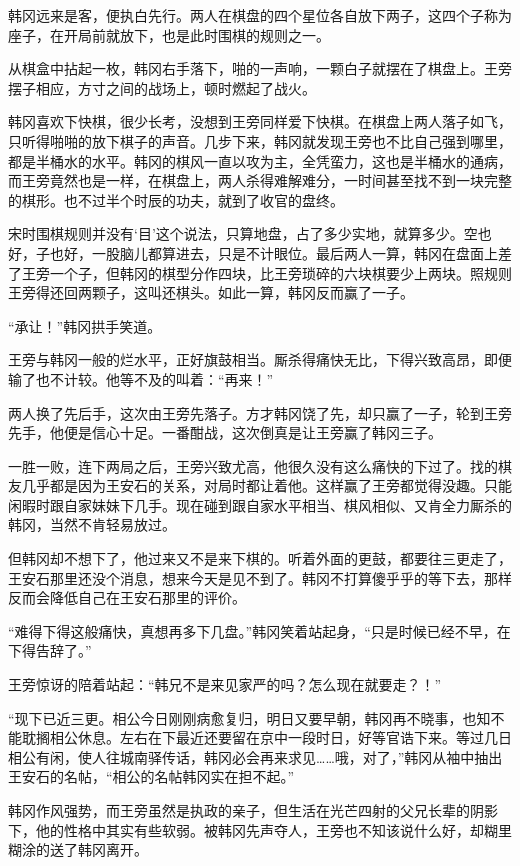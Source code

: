 韩冈远来是客，便执白先行。两人在棋盘的四个星位各自放下两子，这四个子称为座子，在开局前就放下，也是此时围棋的规则之一。

从棋盒中拈起一枚，韩冈右手落下，啪的一声响，一颗白子就摆在了棋盘上。王旁摆子相应，方寸之间的战场上，顿时燃起了战火。

韩冈喜欢下快棋，很少长考，没想到王旁同样爱下快棋。在棋盘上两人落子如飞，只听得啪啪的放下棋子的声音。几步下来，韩冈就发现王旁也不比自己强到哪里，都是半桶水的水平。韩冈的棋风一直以攻为主，全凭蛮力，这也是半桶水的通病，而王旁竟然也是一样，在棋盘上，两人杀得难解难分，一时间甚至找不到一块完整的棋形。也不过半个时辰的功夫，就到了收官的盘终。

宋时围棋规则并没有‘目’这个说法，只算地盘，占了多少实地，就算多少。空也好，子也好，一股脑儿都算进去，只是不计眼位。最后两人一算，韩冈在盘面上差了王旁一个子，但韩冈的棋型分作四块，比王旁琐碎的六块棋要少上两块。照规则王旁得还回两颗子，这叫还棋头。如此一算，韩冈反而赢了一子。

“承让！”韩冈拱手笑道。

王旁与韩冈一般的烂水平，正好旗鼓相当。厮杀得痛快无比，下得兴致高昂，即便输了也不计较。他等不及的叫着：“再来！”

两人换了先后手，这次由王旁先落子。方才韩冈饶了先，却只赢了一子，轮到王旁先手，他便是信心十足。一番酣战，这次倒真是让王旁赢了韩冈三子。

一胜一败，连下两局之后，王旁兴致尤高，他很久没有这么痛快的下过了。找的棋友几乎都是因为王安石的关系，对局时都让着他。这样赢了王旁都觉得没趣。只能闲暇时跟自家妹妹下几手。现在碰到跟自家水平相当、棋风相似、又肯全力厮杀的韩冈，当然不肯轻易放过。

但韩冈却不想下了，他过来又不是来下棋的。听着外面的更鼓，都要往三更走了，王安石那里还没个消息，想来今天是见不到了。韩冈不打算傻乎乎的等下去，那样反而会降低自己在王安石那里的评价。

“难得下得这般痛快，真想再多下几盘。”韩冈笑着站起身，“只是时候已经不早，在下得告辞了。”

王旁惊讶的陪着站起：“韩兄不是来见家严的吗？怎么现在就要走？！”

“现下已近三更。相公今日刚刚病愈复归，明日又要早朝，韩冈再不晓事，也知不能耽搁相公休息。左右在下最近还要留在京中一段时日，好等官诰下来。等过几日相公有闲，使人往城南驿传话，韩冈必会再来求见……哦，对了，”韩冈从袖中抽出王安石的名帖，“相公的名帖韩冈实在担不起。”

韩冈作风强势，而王旁虽然是执政的亲子，但生活在光芒四射的父兄长辈的阴影下，他的性格中其实有些软弱。被韩冈先声夺人，王旁也不知该说什么好，却糊里糊涂的送了韩冈离开。

